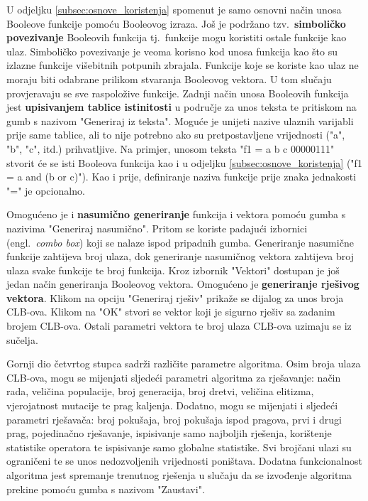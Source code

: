 \documentclass[times, utf8, diplomski]{fer}
\begin{document}
U odjeljku \ref{subsec:osnove_koristenja} spomenut je samo osnovni način unosa Booleove funkcije pomoću Booleovog izraza. Još je podržano tzv.~\textbf{simboličko povezivanje} Booleovih funkcija tj.~funkcije mogu koristiti ostale funkcije kao ulaz. Simboličko povezivanje je veoma korisno kod unosa funkcija kao što su izlazne funkcije višebitnih potpunih zbrajala. Funkcije koje se koriste kao ulaz ne moraju biti odabrane prilikom stvaranja Booleovog vektora. U tom slučaju provjeravaju se sve raspoložive funkcije. Zadnji način unosa Booleovih funkcija jest \textbf{upisivanjem tablice istinitosti} u područje za unos teksta te pritiskom na gumb s nazivom "Generiraj iz teksta". Moguće je unijeti nazive ulaznih varijabli prije same tablice, ali to nije potrebno ako su pretpostavljene vrijednosti ("a", "b", "c", itd.) prihvatljive. Na primjer, unosom teksta "f1 = a b c 00000111" stvorit će se isti Booleova funkcija kao i u odjeljku \ref{subsec:osnove_koristenja} ("f1 = a and (b or c)"). Kao i prije, definiranje naziva funkcije prije znaka jednakosti "=" je opcionalno.

Omogućeno je i \textbf{nasumično generiranje} funkcija i vektora pomoću gumba s nazivima "Generiraj nasumično". Pritom se koriste padajući izbornici (engl.~\textit{combo box}) koji se nalaze ispod pripadnih gumba. Generiranje nasumične funkcije zahtijeva broj ulaza, dok generiranje nasumičnog vektora zahtijeva broj ulaza svake funkcije te broj funkcija. Kroz izbornik "Vektori" dostupan je još jedan način generiranja Booleovog vektora. Omogućeno je \textbf{generiranje rješivog vektora}. Klikom na opciju "Generiraj rješiv" prikaže se dijalog za unos broja CLB-ova. Klikom na "OK" stvori se vektor koji je sigurno rješiv sa zadanim brojem CLB-ova. Ostali parametri vektora te broj ulaza CLB-ova uzimaju se iz sučelja.

Gornji dio četvrtog stupca sadrži različite parametre algoritma. Osim broja ulaza CLB-ova, mogu se mijenjati sljedeći parametri algoritma za rješavanje: način rada, veličina populacije, broj generacija, broj dretvi, veličina elitizma, vjerojatnost mutacije te  prag kaljenja. Dodatno, mogu se mijenjati i sljedeći parametri rješavača: broj pokušaja, broj pokušaja ispod pragova, prvi i drugi prag, pojedinačno rješavanje, ispisivanje samo najboljih rješenja, korištenje statistike operatora te ispisivanje samo globalne statistike. Svi brojčani ulazi su ograničeni te se unos nedozvoljenih vrijednosti poništava. Dodatna funkcionalnost algoritma jest spremanje trenutnog rješenja u slučaju da se izvođenje algoritma prekine pomoću gumba s nazivom "Zaustavi".
\end{document}

